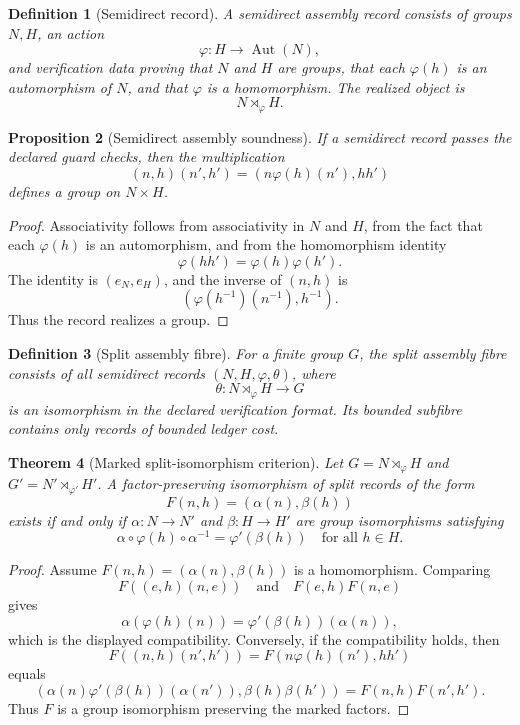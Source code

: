 \documentclass[11pt]{article}
\newtheorem{theorem}{Theorem}[section]
\newtheorem{proposition}[theorem]{Proposition}
\newtheorem{definition}[theorem]{Definition}
\begin{document}
\begin{definition}[Semidirect record]
A semidirect assembly record consists of groups \(N,H\), an action
\[
\varphi:H\to\operatorname{Aut}(N),
\]
and verification data proving that \(N\) and \(H\) are groups, that each \(\varphi(h)\) is an automorphism of \(N\), and that \(\varphi\) is a homomorphism.  The realized object is
\[
N\rtimes_{\varphi}H.
\]
\end{definition}

\begin{proposition}[Semidirect assembly soundness]
If a semidirect record passes the declared guard checks, then the multiplication
\[
(n,h)(n',h')=(n\varphi(h)(n'),hh')
\]
defines a group on \(N\times H\).
\end{proposition}

\begin{proof}
Associativity follows from associativity in \(N\) and \(H\), from the fact that each \(\varphi(h)\) is an automorphism, and from the homomorphism identity
\[
\varphi(hh')=\varphi(h)\varphi(h').
\]
The identity is \((e_N,e_H)\), and the inverse of \((n,h)\) is
\[
(\varphi(h^{-1})(n^{-1}),h^{-1}).
\]
Thus the record realizes a group.
\end{proof}

\begin{definition}[Split assembly fibre]
For a finite group \(G\), the split assembly fibre consists of all semidirect records \((N,H,\varphi,\theta)\), where
\[
\theta:N\rtimes_{\varphi}H\to G
\]
is an isomorphism in the declared verification format.  Its bounded subfibre contains only records of bounded ledger cost.
\end{definition}

\begin{theorem}[Marked split-isomorphism criterion]
Let \(G=N\rtimes_{\varphi}H\) and \(G'=N'\rtimes_{\varphi'}H'\).  A factor-preserving isomorphism of split records of the form
\[
F(n,h)=(\alpha(n),\beta(h))
\]
exists if and only if \(\alpha:N\to N'\) and \(\beta:H\to H'\) are group isomorphisms satisfying
\[
\alpha\circ\varphi(h)\circ\alpha^{-1}
=
\varphi'(\beta(h))
\quad\text{for all }h\in H.
\]
\end{theorem}

\begin{proof}
Assume \(F(n,h)=(\alpha(n),\beta(h))\) is a homomorphism.  Comparing
\[
F((e,h)(n,e))
\quad\text{and}\quad
F(e,h)F(n,e)
\]
gives
\[
\alpha(\varphi(h)(n))=\varphi'(\beta(h))(\alpha(n)),
\]
which is the displayed compatibility.  Conversely, if the compatibility holds, then
\[
F((n,h)(n',h'))
=
F(n\varphi(h)(n'),hh')
\]
equals
\[
(\alpha(n)\varphi'(\beta(h))(\alpha(n')),\beta(h)\beta(h'))
=
F(n,h)F(n',h').
\]
Thus \(F\) is a group isomorphism preserving the marked factors.
\end{proof}
\end{document}
